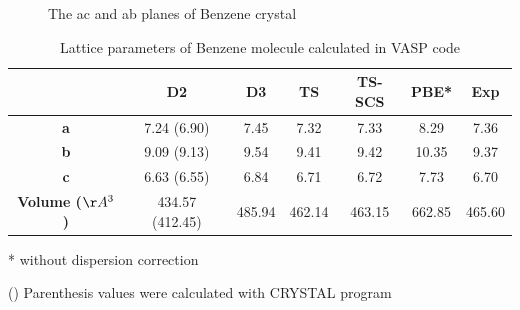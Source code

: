  	\begin{figure}[H]
 		\begin{center}
 		\end{center}
 		\caption{The ac and ab planes of Benzene crystal}  \label{fig-benzsol}
 	\end{figure}
 	
 	
 	\begin{table}[H]
 		\caption{Lattice parameters of Benzene molecule calculated in VASP code} \label{table-benzsol}
 		\begin{center}
 			\begin{threeparttable}
 			\begin{tabular}{c c c c c c c}
 				\toprule
 				& \textbf{D2} & \textbf{D3} & \textbf{TS} & \textbf{TS-SCS} & \textbf{PBE*} & \textbf{Exp} \\
 				\midrule
 				\textbf{a} &7.24 (6.90)& 7.45 & 7.32 & 7.33  & 8.29 & 7.36\\
 				\textbf{b}& 9.09 (9.13) & 9.54 & 9.41 & 9.42 & 10.35 & 9.37\\
 				\textbf{c}& 6.63 (6.55) & 6.84 & 6.71 & 6.72 & 7.73 & 6.70 \\
 				\textbf{Volume ($\AA^{3}$)}& 434.57 (412.45) & 485.94& 462.14 & 463.15 & 662.85 & 465.60\\
 				\bottomrule
 			\end{tabular}
 			
 			\begin{tablenotes}
 				\item[*] without dispersion correction
 				\item[()] Parenthesis values were calculated with CRYSTAL program
 			\end{tablenotes}
 		\end{threeparttable}
 		\end{center}
 	\end{table}
 
